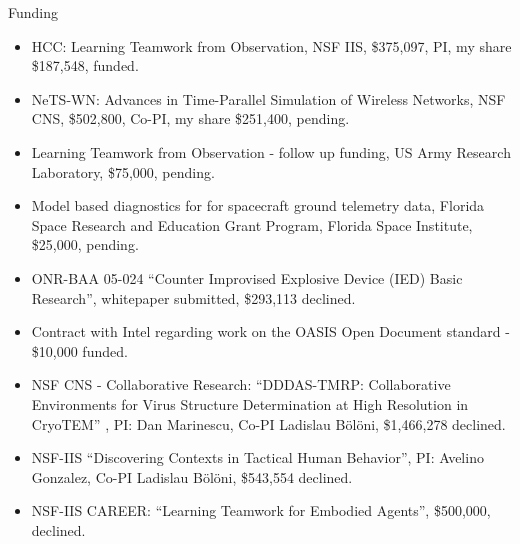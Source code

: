 \begin{category}{Funding}



\begin{itemize}

\item HCC: Learning Teamwork from Observation, NSF IIS, \$375,097, PI,
my share \$187,548, funded.

\item NeTS-WN: Advances in Time-Parallel Simulation of Wireless Networks, NSF
CNS, \$502,800, Co-PI, my share \$251,400, pending. 

\item Learning Teamwork from Observation - follow up funding, US Army Research
Laboratory, \$75,000, pending.

\item Model based diagnostics for for spacecraft ground telemetry data, Florida
Space Research and Education Grant Program, Florida Space Institute, \$25,000,
pending. 

\end{itemize}



\begin{itemize}
\item ONR-BAA 05-024 ``Counter Improvised Explosive Device (IED) Basic Research'',
whitepaper submitted, \$293,113 declined.
\item Contract with Intel regarding work on the OASIS Open Document standard -
\$10,000 funded.
\item NSF CNS - Collaborative Research: ``DDDAS-TMRP: Collaborative Environments
for Virus Structure Determination at High Resolution in CryoTEM'' , PI: Dan
Marinescu, Co-PI Ladislau B{\"o}l{\"o}ni, \$1,466,278 declined. 
\item NSF-IIS ``Discovering Contexts in Tactical Human Behavior'',  PI: Avelino
Gonzalez, Co-PI Ladislau B{\"o}l{\"o}ni, \$543,554 declined.
\item NSF-IIS CAREER: ``Learning Teamwork for Embodied Agents'', \$500,000, declined.
\end{itemize}


\end{category}

